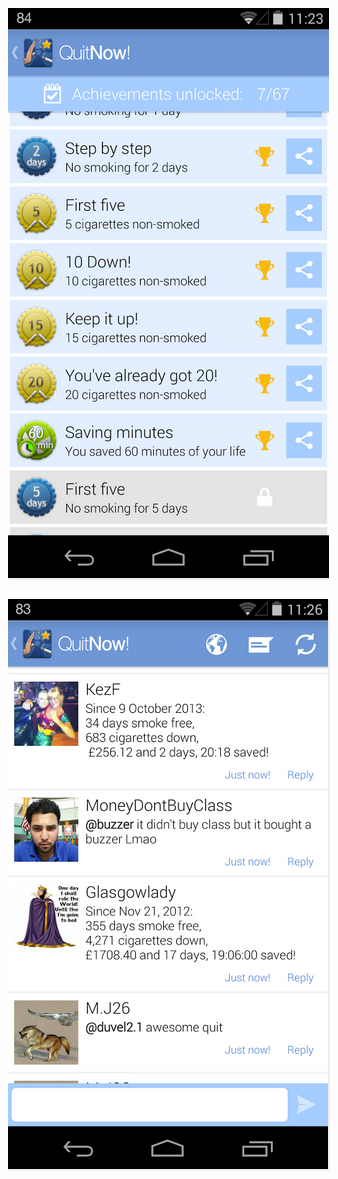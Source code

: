 \documentclass[a4paper,12pt]{article}
\begin{document}
\begin{figure}[!ht]
\centering
\begin{minipage}{.5\textwidth}
  \centering
  \includegraphics[width=.6\linewidth]{./images/application-quitnow-achievements}
  \label{application-quitnow-achievements}
\end{minipage}%
\begin{minipage}{.5\textwidth}
  \centering
  \includegraphics[width=.6\linewidth]{./images/application-quitnow-social}
  \label{application-quitnow-social}
\end{minipage}
\end{figure}
\end{document}
